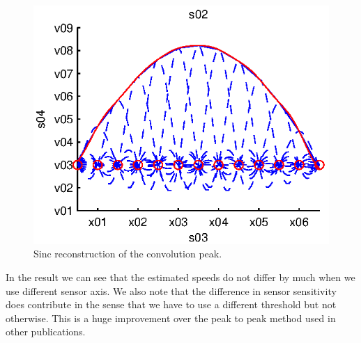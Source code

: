 \begin{figure}[!ht]
  \centering
  	\begin{minipage}{0.45\linewidth}
  \centering
  
   \includegraphics[width=\linewidth]{images/reconst}
  \caption[Sinc reconstruction]{Sinc reconstruction of the convolution peak.}
  \label{fig:reconst}
  \end{minipage}
%    
 \end{figure}

 In the result we can see that the estimated speeds do not differ by much when we use different sensor axis. We also note that the difference in sensor sensitivity does contribute in the sense that we have to use a different threshold but not otherwise. This is a huge improvement over the peak to peak method used in other publications.

